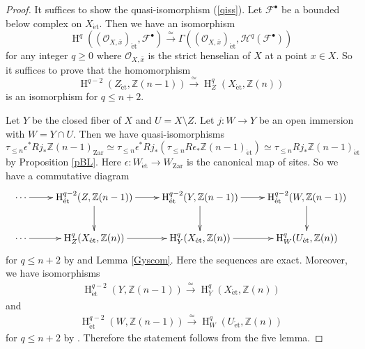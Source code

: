\documentclass{article}
\newcommand{\et}{\mathrm{\acute{e}t}}
\newcommand{\Zar}{\mathrm{Zar}}
\newcommand{\HO}{\operatorname{H}}
\begin{document}
%
\begin{proof}\upshape
It suffices to show the quasi-isomorphism (\ref{qiss}). 
Let $\mathcal{F}^{\bullet}$ be a bounded below complex on $X_{\et}$.
Then we have an isomorphism
%
\begin{equation*}
\HO^{q}\left(
(\mathcal{O}_{X, \bar{x}})_{\et},
\mathcal{F}^{\bullet}
\right)
\xrightarrow{\simeq}
\Gamma\left(
(\mathcal{O}_{X, \bar{x}})_{\et},
\mathcal{H}^{q}(\mathcal{F}^{\bullet})
\right)
\end{equation*}
%
for any integer $q\geq 0$ where
$\mathcal{O}_{X, \bar{x}}$ is the strict henselian of $X$ 
at a point $x\in X$. So it suffices to prove that 
the homomorphism
%
\begin{equation*}
\HO^{q-2}(
Z_{\et}, 
\mathbb{Z}(n-1)
)    
\xrightarrow{\simeq}
\HO^{q}_{Z}(
X_{\et},
\mathbb{Z}(n)
)
\end{equation*}
%
is an isomorphism for $q\leq n+2$.

Let $Y$ be the closed fiber of $X$
and $U=X\setminus Z$.
Let $j: W\to Y$ be an open immersion with 
$W=Y\cap U$. Then we have quasi-isomorphisms
%
\begin{equation*}
\tau_{\leq n}\epsilon^{*}Rj_{*}\mathbb{Z}(n-1)_{\Zar} 
\simeq
\tau_{\leq n}\epsilon^{*}Rj_{*}
\left(
\tau_{\leq n}R\epsilon_{*}\mathbb{Z}(n-1)_{\et}
\right)
\simeq
\tau_{\leq n}Rj_{*}\mathbb{Z}(n-1)_{\et}
\end{equation*}
%
by Proposition \ref{pBL}. Here 
$\epsilon: W_{\et}\to W_{\Zar}$ is the canonical map
of sites.
So we have a commutative diagram
%
\footnotesize
\begin{equation*}
\xymatrix{
\cdots
\ar[r]
&
\HO^{q-2}_{\et}(
Z,
\mathbb{Z}(n-1)
)
\ar[r]\ar[d]
&
\HO^{q-2}_{\et}(
Y,
\mathbb{Z}(n-1)
)
\ar[r]\ar[d]
&
\HO^{q-2}_{\et}(
W,
\mathbb{Z}(n-1)
)  \ar[d]
\\
\cdots 
\ar[r]
&
\HO^{q}_{Z}(
X_{\et},
\mathbb{Z}(n)
)
\ar[r]
&
\HO^{q}_{Y}(
X_{\et},
\mathbb{Z}(n)
)
\ar[r]
&
\HO^{q}_{W}(
U_{\et},
\mathbb{Z}(n)
)
}    
\end{equation*}
\normalsize
%
for $q\leq n+2$ by
\cite[p.776, Proposition 2.2.a)]{Ge}
and Lemma \ref{Gyscom}.
Here the sequences are exact.
Moreover, we have isomorphisms
%
\begin{align*}
\HO_{\et}^{q-2}(
Y,
\mathbb{Z}(n-1)
)    
\xrightarrow{\simeq}
\HO^{q}_{Y}(
X_{\et},
\mathbb{Z}(n)
)
\end{align*}
%
and
%
\begin{align*}
\HO_{\et}^{q-2}(
W,
\mathbb{Z}(n-1)
)    
\xrightarrow{\simeq}
\HO^{q}_{W}(
U_{\et},
\mathbb{Z}(n)
)
\end{align*}
%
for $q\leq n+2$ by \cite[p.33, Proposition 2.1]{SM}.
Therefore the statement follows from the five lemma.
\end{proof}
%
\end{document}

